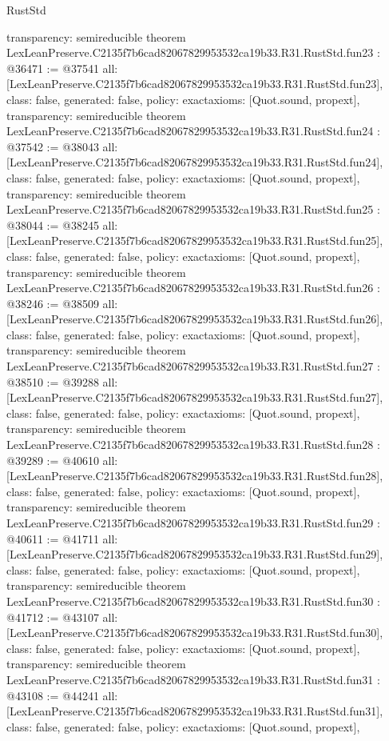 \begin{lexlean}{RustStd}
\begin{coremodule}
{  transparency: semireducible
}
theorem LexLeanPreserve.C2135f7b6cad82067829953532ca19b33.R31.RustStd.fun23 : @36471 := @37541 {
  all: [LexLeanPreserve.C2135f7b6cad82067829953532ca19b33.R31.RustStd.fun23],
  class: false,
  generated: false,
  policy: exact{axioms: [Quot.sound, propext]},
  transparency: semireducible
}
theorem LexLeanPreserve.C2135f7b6cad82067829953532ca19b33.R31.RustStd.fun24 : @37542 := @38043 {
  all: [LexLeanPreserve.C2135f7b6cad82067829953532ca19b33.R31.RustStd.fun24],
  class: false,
  generated: false,
  policy: exact{axioms: [Quot.sound, propext]},
  transparency: semireducible
}
theorem LexLeanPreserve.C2135f7b6cad82067829953532ca19b33.R31.RustStd.fun25 : @38044 := @38245 {
  all: [LexLeanPreserve.C2135f7b6cad82067829953532ca19b33.R31.RustStd.fun25],
  class: false,
  generated: false,
  policy: exact{axioms: [Quot.sound, propext]},
  transparency: semireducible
}
theorem LexLeanPreserve.C2135f7b6cad82067829953532ca19b33.R31.RustStd.fun26 : @38246 := @38509 {
  all: [LexLeanPreserve.C2135f7b6cad82067829953532ca19b33.R31.RustStd.fun26],
  class: false,
  generated: false,
  policy: exact{axioms: [Quot.sound, propext]},
  transparency: semireducible
}
theorem LexLeanPreserve.C2135f7b6cad82067829953532ca19b33.R31.RustStd.fun27 : @38510 := @39288 {
  all: [LexLeanPreserve.C2135f7b6cad82067829953532ca19b33.R31.RustStd.fun27],
  class: false,
  generated: false,
  policy: exact{axioms: [Quot.sound, propext]},
  transparency: semireducible
}
theorem LexLeanPreserve.C2135f7b6cad82067829953532ca19b33.R31.RustStd.fun28 : @39289 := @40610 {
  all: [LexLeanPreserve.C2135f7b6cad82067829953532ca19b33.R31.RustStd.fun28],
  class: false,
  generated: false,
  policy: exact{axioms: [Quot.sound, propext]},
  transparency: semireducible
}
theorem LexLeanPreserve.C2135f7b6cad82067829953532ca19b33.R31.RustStd.fun29 : @40611 := @41711 {
  all: [LexLeanPreserve.C2135f7b6cad82067829953532ca19b33.R31.RustStd.fun29],
  class: false,
  generated: false,
  policy: exact{axioms: [Quot.sound, propext]},
  transparency: semireducible
}
theorem LexLeanPreserve.C2135f7b6cad82067829953532ca19b33.R31.RustStd.fun30 : @41712 := @43107 {
  all: [LexLeanPreserve.C2135f7b6cad82067829953532ca19b33.R31.RustStd.fun30],
  class: false,
  generated: false,
  policy: exact{axioms: [Quot.sound, propext]},
  transparency: semireducible
}
theorem LexLeanPreserve.C2135f7b6cad82067829953532ca19b33.R31.RustStd.fun31 : @43108 := @44241 {
  all: [LexLeanPreserve.C2135f7b6cad82067829953532ca19b33.R31.RustStd.fun31],
  class: false,
  generated: false,
  policy: exact{axioms: [Quot.sound, propext]},
}
\end{coremodule}
\end{lexlean}
